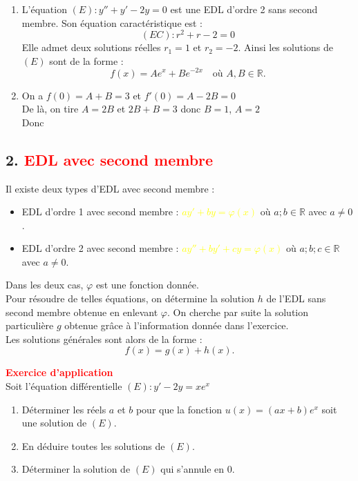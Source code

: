 \documentclass[12pt]{article}
\begin{document}
\begin{enumerate}
    \item L’équation $(E) : y'' + y' - 2y = 0$ est une EDL d’ordre 2 sans second membre. Son équation caractéristique est :
    \[
    (EC) : r^2 + r - 2 = 0
    \]
    Elle admet deux solutions réelles $r_1 = 1$ et $r_2 = -2$. Ainsi les solutions de $(E)$ sont de la forme :
    \[
    \boxed{f(x) = Ae^{x} + Be^{-2x}} \quad \text{où } A, B \in \mathbb{R}.
    \]

    \item On a $f(0) = A + B = 3$ et $f'(0) = A - 2B = 0$\\
    De là, on tire $A = 2B$ et $2B + B = 3$ donc $B = 1$, $A = 2$\\
    Donc 
\end{enumerate}

\subsection*{2. \textcolor{red}{EDL avec second membre}}

Il existe deux types d’EDL avec second membre :

\begin{itemize}
    \item EDL d’ordre 1 avec second membre : \textcolor{yellow}{$ay' + by = \varphi(x)$} où $a ; b \in \mathbb{R}$ avec $a \neq 0$.
    \item EDL d’ordre 2 avec second membre : \textcolor{yellow}{$ay'' + by' + cy = \varphi(x)$} où $a ; b ; c \in \mathbb{R}$ avec $a \neq 0$.
\end{itemize}

Dans les deux cas, $\varphi$ est une fonction donnée.\\

Pour résoudre de telles équations, on détermine la solution $h$ de l’EDL sans second membre obtenue en enlevant $\varphi$. On cherche par suite la solution particulière $g$ obtenue grâce à l’information donnée dans l’exercice.\\

Les solutions générales sont alors de la forme : 
\[
\boxed{f(x) = g(x) + h(x)}.
\]

\vspace{0.4cm}
\textbf{\textcolor{red}{Exercice d'application}}\\
Soit l’équation différentielle $(E) : y' - 2y = xe^x$
\begin{enumerate}
    \item Déterminer les réels $a$ et $b$ pour que la fonction $u(x) = (ax + b)e^x$ soit une solution de $(E)$.
    \item En déduire toutes les solutions de $(E)$.
    \item Déterminer la solution de $(E)$ qui s’annule en $0$.
\end{enumerate}
\end{document}
